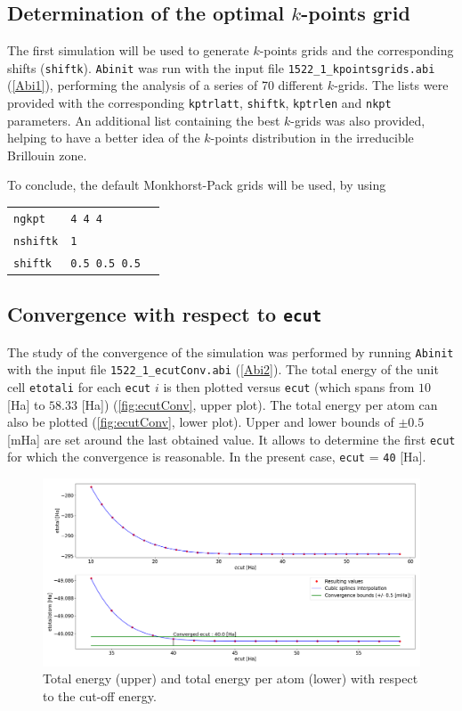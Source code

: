 \documentclass[11pt,a4paper]{article}
\begin{document}
\subsection{Determination of the optimal $k$-points grid}
The first simulation will be used to generate $k$-points grids and the corresponding shifts (\texttt{shiftk}). \texttt{Abinit} was run with the input file \texttt{1522\_1\_kpointsgrids.abi} (\autoref{Abi1}), performing the analysis of a series of 70 different $k$-grids. The lists were provided with the corresponding \texttt{kptrlatt}, \texttt{shiftk}, \texttt{kptrlen} and \texttt{nkpt} parameters. An additional list containing the best $k$-grids was also provided, helping to have a better idea of the $k$-points distribution in the irreducible Brillouin zone.

To conclude, the default Monkhorst-Pack grids will be used, by using
\begin{center}
\begin{tabular}{lll}
\texttt{ngkpt} & \texttt{4 4 4}&\\
\texttt{nshiftk} & \texttt{1} &\\
\texttt{shiftk} &\texttt{0.5 0.5 0.5}
\end{tabular}
\end{center}
\subsection{Convergence with respect to \texttt{ecut}}
The study of the convergence of the simulation was performed by running \texttt{Abinit} with the input file \texttt{1522\_1\_ecutConv.abi} (\autoref{Abi2}).
The total energy of the unit cell \texttt{etotali} for each \texttt{ecut} $i$ is then plotted versus \texttt{ecut} (which spans from $10$ [Ha] to $58.33$ [Ha]) (\autoref{fig:ecutConv}, upper plot). The total energy per atom can also be plotted (\autoref{fig:ecutConv}, lower plot). Upper and lower bounds of $\pm 0.5$ [mHa] are set around the last obtained value. It allows to determine the first \texttt{ecut} for which the convergence is reasonable. In the present case, \texttt{ecut} = \texttt{40} [Ha].
\begin{figure}[H]
\includegraphics[width=\textwidth]{images/ecutConv}
\caption{Total energy (upper) and total energy per atom (lower) with respect to the cut-off energy.}
\label{fig:ecutConv}
\end{figure}
\end{document}
